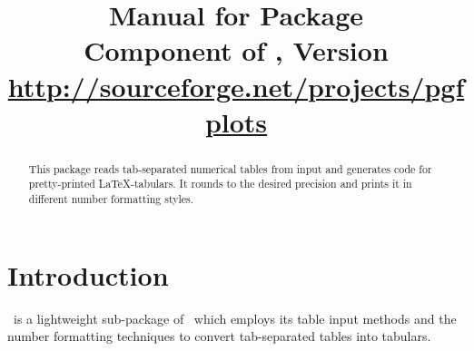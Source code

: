 %
%
%
% 
% 
%
%



\usepackage{array}
\usepackage{colortbl}
\usepackage{booktabs}



\title{%
	Manual for Package \PGFPlotstable\\
	{\small Component of \PGFPlots, Version \pgfplotsversion}\\
	{\small\href{http://sourceforge.net/projects/pgfplots}{http://sourceforge.net/projects/pgfplots}}}


\maketitle
\begin{abstract}%
	This package reads tab-separated numerical tables from input and generates code for pretty-printed \LaTeX-tabulars. It rounds to the desired precision and prints it in different number formatting styles.
\end{abstract}
\tableofcontents
\section{Introduction}
\PGFPlotstable\ is a lightweight sub-package of \PGFPlots\ which employs its table input methods and the number formatting techniques to convert tab-separated tables into tabulars.

